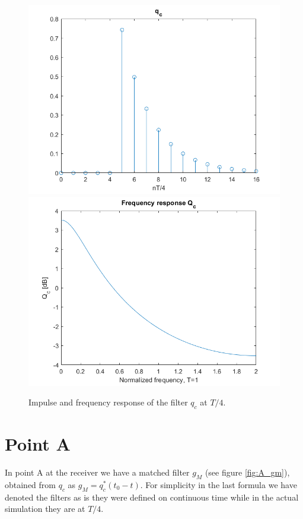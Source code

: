 \documentclass[a4paper,11.5pt]{article}
\begin{document}
\begin{figure}[H]
	\begin{center}   
		\includegraphics[width=\textwidth]{figs/q_c.png} 
		\includegraphics[width=\textwidth]{figs/Qc.png} 
		\caption{Impulse and frequency response of the filter $q_c$ at $T/4$.}
		\label{fig:qc}
	\end{center}
\end{figure} 

\section*{Point A}

In point A at the receiver we have a matched filter $g_{M}$ (see figure \ref{fig:A_gm}), obtained from $q_c$ as $g_M=q_c^*(t_0-t)$. For simplicity in the last formula we have denoted the filters as is they were defined on continuous time while in the actual simulation they are at $T/4$. 
\end{document}
